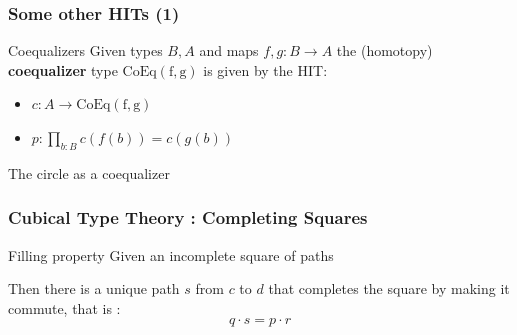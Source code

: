 \documentclass{beamer}
\begin{document}
    \begin{frame}[fragile]
        \frametitle{Some other HITs (1)}
        \begin{alertblock}{Coequalizers}
            Given types $B,A$ and maps $f,g : B \rightarrow  A$ the (homotopy) \textbf{coequalizer} type $\mathrm{CoEq(f,g)}$ is given by the HIT:\\
            \begin{minipage}{.45\textwidth} 
                \begin{itemize}
                \item $c : A \rightarrow \mathrm{CoEq(f,g)}$
                \item $p : \prod_{b : B} c(f(b))=c(g(b))$
                \end{itemize}
            \end{minipage}
            \hfill 
            \begin{minipage}{.45\textwidth} 
                \begin{center}
                \end{center}
            \end{minipage}
        \end{alertblock}
        \pause
        \begin{exampleblock}{The circle as a coequalizer}
            \begin{center}
            \end{center}
        \end{exampleblock}
    \end{frame}
    \begin{frame}[fragile]
        \frametitle{Cubical Type Theory : Completing Squares}
        \begin{alertblock}{Filling property}
            Given an incomplete square of paths 
            \begin{center}
            \end{center}
            Then there is a unique path $s$ from $c$ to $d$ that completes the square by making it commute, that is :
            $$ q \cdot s = p \cdot r $$
        \end{alertblock}
    \end{frame}
\end{document}
